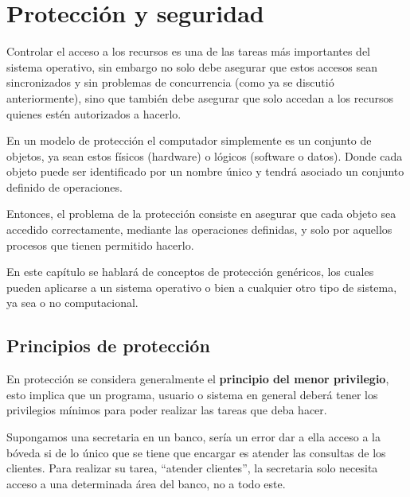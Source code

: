 %
%
%
%

\chapter{Protección y seguridad}
\label{proteccion}
Controlar el acceso a los recursos es una de las tareas más importantes del
sistema operativo, sin embargo no solo debe asegurar que estos accesos sean
sincronizados y sin problemas de concurrencia (como ya se discutió
anteriormente), sino que también debe asegurar que solo accedan a los recursos
quienes estén autorizados a hacerlo.

En un modelo de protección el computador simplemente es un conjunto de objetos,
ya sean estos físicos (hardware) o lógicos (software o datos). Donde cada objeto
puede ser identificado por un nombre único y tendrá asociado un conjunto
definido de operaciones.

Entonces, el problema de la protección consiste en asegurar que cada objeto sea
accedido correctamente, mediante las operaciones definidas, y solo por aquellos
procesos que tienen permitido hacerlo.

En este capítulo se hablará de conceptos de protección genéricos, los cuales
pueden aplicarse a un sistema operativo o bien a cualquier otro tipo de sistema,
ya sea o no computacional.

\section{Principios de protección}
En protección se considera generalmente el \textbf{principio del menor
privilegio}, esto implica que un programa, usuario o sistema en general deberá
tener los privilegios mínimos para poder realizar las tareas que deba hacer.

Supongamos una secretaria en un banco, sería un error dar a ella acceso a la
bóveda si de lo único que se tiene que encargar es atender las consultas de los
clientes. Para realizar su tarea, ``atender clientes'', la secretaria solo
necesita acceso a una determinada área del banco, no a todo este.

